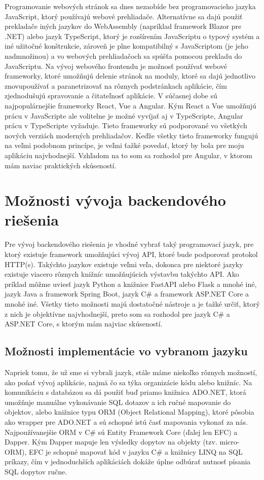 Programovanie webových stránok sa dnes nezaobíde bez programovacieho jazyka JavaScript, ktorý používajú webové prehliadače. Alternatívne 
sa dajú použiť prekladače iných jazykov do WebAssembly (napríklad framework Blazor pre .NET) alebo jazyk TypeScript, ktorý je rozšírením JavaScriptu o typový 
systém a iné užitočné konštrukcie, zároveň je plne kompatibilný s JavaScriptom (je jeho nadmnožinou) a vo webových prehliadačoch sa spúšťa pomocou 
prekladu do JavaScriptu. Na vývoj webového frontendu je možnosť používať webové frameworky, ktoré umožňujú delenie stránok na moduly, 
ktoré sa dajú jednotlivo znovupoužívať a paranetrizovať na rôznych podstránkach aplikácie, čím zjednodušujú spravovanie a čitateľnosť aplikácie. 
V súčasnej dobe sú najpopulárnejšie frameworky React, Vue a Angular. Kým React a Vue umožňujú prácu v JavaScripte ale volitelne je možné vyvíjať 
aj v TypeScripte, Angular prácu v TypeScripte vyžaduje. Tieto frameworky sú podporované vo všetkých nových verziách moderných prehliadačov. 
Keďže všetky tieto frameworky fungujú na veľmi podobnom princípe, je veľmi ťažké povedať, ktorý by bola pre moju aplikáciu najvhodnejší. Vzhľadom 
na to som sa rozhodol pre Angular, v ktorom mám naviac praktických skúseností.

\section{Možnosti vývoja backendového riešenia}

Pre vývoj backendového riešenia je vhodné vybrať taký programovací jazyk, pre ktorý existuje framework umožňujúci vývoj API, ktoré bude podporovať 
protokol HTTP(s). Takýchto jazykov existuje veľmi veľa, dokonca pre niektoré jazyky existuje viacero rôznych knižníc umožňujúcich výstavbu 
takýchto API. Ako príklad môžme uviesť jazyk Python a knižnice FastAPI alebo Flask a mnohé iné, jazyk Java a framework Spring Boot, jazyk C\# a 
framework ASP.NET Core a mnohé iné. Všetky tieto možnosti majú dostatočné nástroje a je ťažké určiť, ktorý z nich je objektívne najvhodnejší, 
preto som sa rozhodol pre jazyk C\# a ASP.NET Core, s ktorým mám najviac skúseností.

\subsection{Možnosti implementácie vo vybranom jazyku}

Napriek tomu, že už sme si vybrali jazyk, stále máme niekoľko rôznych možností, ako poňať vývoj aplikácie, najmä čo sa týka organizácie kódu 
alebo knižníc. Na komunikáciu s databázou sa dá použiť buď priamo knižnica ADO.NET, ktorá umožňuje manuálne vykonávanie SQL dotazov a ich ručné 
mapovanie do objektov, alebo knižnice typu ORM (Object Relational Mapping), ktoré pôsobia ako wrapper pre ADO.NET a sú schopné istú časť mapovania 
vykonať za nás. Najpoužívanejšie ORM v C\# sú Entity Framework Core (ďalej len EFC) a Dapper. Kým Dapper mapuje len výsledky dopytov na objekty (tzv. micro-ORM), 
EFC je schopné mapovať kód v jazyku C\# a knižnicy LINQ na SQL príkazy, čím v jednoduchších aplikáciách dokáže úplne odbúrať nutnosť písania 
SQL dopytov ručne.

